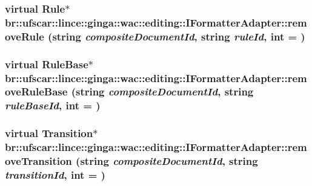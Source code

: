 \label{classbr_1_1ufscar_1_1lince_1_1ginga_1_1wac_1_1editing_1_1IFormatterAdapter_a1994d2a14c28cd577919f3988b224f00}
\hypertarget{classbr_1_1ufscar_1_1lince_1_1ginga_1_1wac_1_1editing_1_1IFormatterAdapter_ab50348d88204b6e715d1fd14ad485661}{
\subsubsection[{removeRule}]{\setlength{\rightskip}{0pt plus 5cm}virtual Rule$\ast$ br::ufscar::lince::ginga::wac::editing::IFormatterAdapter::removeRule (string {\em compositeDocumentId}, \/  string {\em ruleId}, \/  int = {})}}
\label{classbr_1_1ufscar_1_1lince_1_1ginga_1_1wac_1_1editing_1_1IFormatterAdapter_ab50348d88204b6e715d1fd14ad485661}
\hypertarget{classbr_1_1ufscar_1_1lince_1_1ginga_1_1wac_1_1editing_1_1IFormatterAdapter_a9b854fb32b46e6e16557cf2fc24e2f09}{
\subsubsection[{removeRuleBase}]{\setlength{\rightskip}{0pt plus 5cm}virtual RuleBase$\ast$ br::ufscar::lince::ginga::wac::editing::IFormatterAdapter::removeRuleBase (string {\em compositeDocumentId}, \/  string {\em ruleBaseId}, \/  int = {})}}
\label{classbr_1_1ufscar_1_1lince_1_1ginga_1_1wac_1_1editing_1_1IFormatterAdapter_a9b854fb32b46e6e16557cf2fc24e2f09}
\hypertarget{classbr_1_1ufscar_1_1lince_1_1ginga_1_1wac_1_1editing_1_1IFormatterAdapter_adc780d90fe7d64924f7e04aaf81c3462}{
\subsubsection[{removeTransition}]{\setlength{\rightskip}{0pt plus 5cm}virtual Transition$\ast$ br::ufscar::lince::ginga::wac::editing::IFormatterAdapter::removeTransition (string {\em compositeDocumentId}, \/  string {\em transitionId}, \/  int = {})}}

